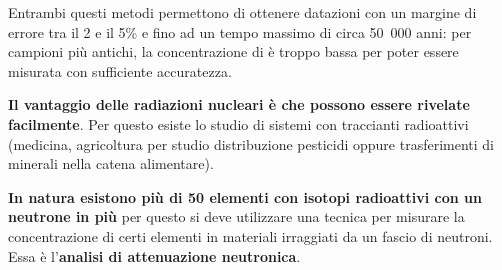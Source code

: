 \documentclass[a4paper,11pt,twoside,openany]{book}
\theoremstyle{definition}
\theoremstyle{plain}
\theoremstyle{plain}
\theoremstyle{definition}
\begin{document}
Entrambi questi metodi permettono di ottenere datazioni con un margine di errore tra il 2 e il 5\% e fino ad un tempo massimo di circa \si{50.000} anni: per campioni più antichi, la concentrazione di  è troppo bassa per poter essere misurata con sufficiente accuratezza.

\textbf{Il vantaggio delle radiazioni nucleari è che possono essere rivelate facilmente}. Per questo esiste lo studio di sistemi con traccianti radioattivi (medicina, agricoltura per studio distribuzione pesticidi oppure trasferimenti di minerali nella catena alimentare).

\textbf{In natura esistono più di 50 elementi con isotopi radioattivi con un neutrone in più} per questo si deve utilizzare una tecnica per misurare la concentrazione di certi elementi in materiali irraggiati da un fascio di neutroni. Essa è l'\textbf{analisi di attenuazione neutronica}.
\end{document}
